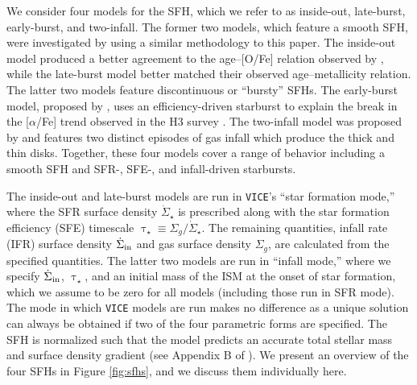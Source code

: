 \documentclass[twocolumn,twocolappendix,linenumbers,trackchanges]{aastex631}
\newcommand{\aFe}{[$\alpha$/Fe]\xspace}
\newcommand{\vice}{{\tt VICE}\xspace}
\begin{document}
We consider four models for the SFH, which we refer to as inside-out, late-burst, early-burst, and two-infall. 
The former two models, which feature a smooth SFH, were investigated by  using a similar methodology to this paper. The inside-out model produced a better agreement to the age--[O/Fe] relation observed by \citet{Feuillet2019-MilkyWayAges}, while the late-burst model better matched their observed age--metallicity relation. 
The latter two models feature discontinuous or ``bursty'' SFHs. The early-burst model, proposed by \citet{Conroy2022-ThickDisk}, uses an efficiency-driven starburst to explain the break in the \aFe trend observed in the H3 survey \citep{Conroy2019-H3Survey}.
The two-infall model was proposed by \citet{Chiappini1997-TwoInfall} and features two distinct episodes of gas infall which produce the thick and thin disks.
Together, these four models cover a range of behavior including a smooth SFH and SFR-, SFE-, and infall-driven starbursts.

The inside-out and late-burst models
are run in \vice's ``star formation mode,'' where the SFR surface density $\dot\Sigma_\star$ is prescribed along with the star formation efficiency (SFE) timescale $\uptau_\star\equiv \Sigma_g/\dot\Sigma_\star$. The remaining quantities, infall rate (IFR) surface density $\dot\Sigma_{\rm in}$ and gas surface density $\Sigma_g$, are calculated from the specified quantities. The latter two models are run in ``infall mode,'' where we specify $\dot\Sigma_{\rm in}$, $\uptau_\star$, and an initial mass of the ISM at the onset of star formation, which we assume to be zero for all models (including those run in SFR mode). The mode in which \vice models are run makes no difference as a unique solution can always be obtained if two of the four parametric forms are specified. 
The SFH is normalized such that the model predicts an accurate total stellar mass and surface density gradient (see Appendix B of ).
We present an overview of the four SFHs in Figure \ref{fig:sfhs}, and we discuss them individually here.
\end{document}

